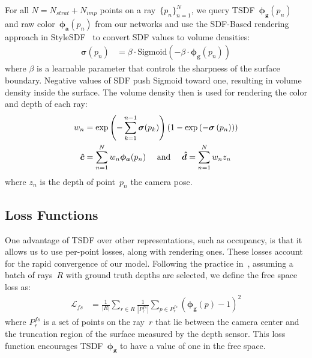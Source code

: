 For all $N=N_{strat}+N_{imp}$ points on a ray~$\{p_{n}\}_{n=1}^{N}$, we query TSDF~$\boldsymbol{\phi_{g}}(p_{n})$ and raw color~$\boldsymbol{\phi_{a}}(p_{n})$ from our networks and use the SDF-Based rendering approach in StyleSDF~\cite{or2022stylesdf} to convert SDF values to volume densities:
\begin{align}
	\boldsymbol{\sigma}(p_{n}) &= \beta \cdot \text{Sigmoid} \left(-\beta \cdot \boldsymbol{\phi_{g}}(p_{n}) \right)
\end{align}
where $\beta$ is a learnable parameter that controls the sharpness of the surface boundary. Negative values of SDF push Sigmoid toward one, resulting in volume density inside the surface. The volume density then is used for rendering the color and depth of each ray:
\begin{align}
    w_{n} &= \exp \left( -\sum_{k=1}^{n-1} \boldsymbol{\sigma}(p_{k}) \right) \left( 1 - \exp \left(-\boldsymbol{\sigma}\left(p_{n}\right) \right)\right) \notag 
    \\
	\boldsymbol{\hat{c}} &= \sum_{n=1}^{N} w_{n} \boldsymbol{\phi_{a}}(p_{n}) \text{\phantom{00} and \phantom{00}} \boldsymbol{\hat{d}} = \sum_{n=1}^{N} w_{n} z_{n}
\end{align}
where $z_{n}$ is the depth of point~$p_{n}$ \wrt the camera pose.

\subsection{Loss Functions} \label{sec:c4_losses}
One advantage of TSDF over other representations, such as occupancy, is that it allows us to use per-point losses, along with rendering ones. These losses account for the rapid convergence of our model. Following the practice in~\cite{azinovic2022neural}, assuming a batch of rays~$R$ with ground truth depths are selected, we define the free space loss as:
\begin{align}
	\mathcal{L}_{fs} &= \frac{1}{|R|} \sum_{r \in R} \frac{1}{|P_{r}^{fs}|} \sum_{p \in P_{r}^{fs}} (\boldsymbol{\phi_{g}}(p) - 1)^2
\end{align}
where $P_{r}^{fs}$ is a set of points on the ray~$r$ that lie between the camera center and the truncation region of the surface measured by the depth sensor. This loss function encourages TSDF~$\boldsymbol{\phi_{g}}$ to have a value of one in the free space.

